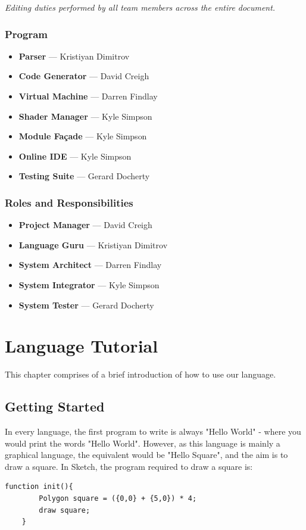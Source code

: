 \documentclass{l3proj}
\begin{document}
\textit{Editing duties performed by all team members across the entire document.}
\subsection{Program}
\label{cont-prog}
\begin{itemize}
\item \textbf{Parser} --- Kristiyan Dimitrov
\item \textbf{Code Generator} --- David Creigh
\item \textbf{Virtual Machine} --- Darren Findlay
\item \textbf{Shader Manager} --- Kyle Simpson
\item \textbf{Module Fa\c{c}ade} --- Kyle Simpson
\item \textbf{Online IDE} --- Kyle Simpson
\item \textbf{Testing Suite} --- Gerard Docherty
\end{itemize}
\subsection{Roles and Responsibilities}
\label{cont-prog}
\begin{itemize}
\item \textbf{Project Manager} --- David Creigh 
\item \textbf{Language Guru} --- Kristiyan Dimitrov
\item \textbf{System Architect} --- Darren Findlay
\item \textbf{System Integrator} --- Kyle Simpson
\item \textbf{System Tester} --- Gerard Docherty


\end{itemize}
\appendix
\chapter{Language Tutorial}
\label{tut}
This chapter comprises of a brief introduction of how to use our language.
\section{Getting Started}
\label{start}
In every language, the first program to write is always "Hello World" - where you would print the words "Hello World". However, as this language is mainly a graphical language, the equivalent would be "Hello Square", and the aim is to draw a square. In Sketch, the program required to draw a square is:
\lstset{%
      basicstyle=\ttfamily\footnotesize\bfseries,
      xleftmargin=.1\textwidth, xrightmargin=.1\textwidth,
      captionpos=b,
      tabsize=4
    }
\begin{lstlisting}[caption={Hello Square},label={lst:tutorial-hello}]
    function init(){
        Polygon square = ({0,0} + {5,0}) * 4;
        draw square;
    }
\end{lstlisting}
\end{document}
